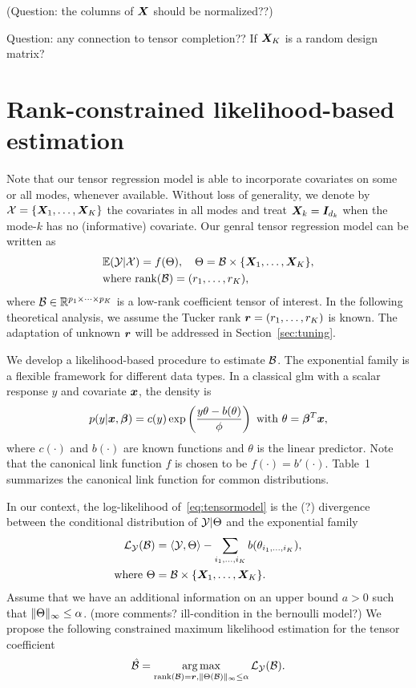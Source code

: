 \documentclass[twoside]{article}
\theoremstyle{plain}
\theoremstyle{definition}
\begin{document}
(Question: the columns of $\bm X$ should be normalized??)

Question: any connection to tensor completion?? If $\bm X_K$ is a random design matrix? 

\section{Rank-constrained likelihood-based estimation}
Note that our tensor regression model is able to incorporate covariates on some or all modes, whenever available. Without loss of generality, we denote by $\mathcal{X}=\{\bm X_1,\ldots,\bm X_K\}$ the covariates in all modes and treat $\bm X_k=\bm I_{d_k}$ when the mode-$k$ has no (informative) covariate. Our genral tensor regression model can be written as
\begin{align}\label{eq:tensormodel}
&\mathbb{E}(\mathcal{Y}|\mathcal{X})=f(\Theta),\quad \Theta =\mathcal{B}\times\{\bm X_1,\ldots,\bm X_K\},\notag\\
&\text{where}\ \text{rank}(\mathcal{B})=(r_1,\ldots,r_K),
\end{align}
where $\mathcal{B}\in\mathbb{R}^{p_1\times \cdots\times p_K}$ is a low-rank coefficient tensor of interest. In the following theoretical analysis, we assume the Tucker rank $\bm{r}=(r_1,\ldots,r_K)$ is known. The adaptation of unknown $\bm{r}$ will be addressed in Section~\ref{sec:tuning}. 

We develop a likelihood-based procedure to estimate $\mathcal{B}$. The exponential family is a flexible framework for different data types. In a classical glm with a scalar response $y$ and covariate $\bm x$, the density is 
\[
p(y|\bm x, \boldsymbol{\beta})=c(y)\exp\left({y\theta- b(\theta) \over \phi}\right)\ \text{with}\ \theta=\boldsymbol{\beta}^T\bm x,
\]
where $c(\cdot)$ and $b(\cdot)$ are known functions and $\theta$ is the linear predictor. Note that the canonical link function $f$ is chosen to be $f(\cdot)=b'(\cdot)$. Table~1 summarizes the canonical link function for common distributions. 

In our context, the log-likelihood of~\eqref{eq:tensormodel} is the (?) divergence between the conditional distribution of $\mathcal{Y}|\Theta$ and the exponential family
\begin{align}
\mathcal{L}_{\mathcal{Y}}(\mathcal{B})&=\langle \mathcal{Y}, \Theta \rangle - \sum_{i_1,\ldots,i_K} b(\theta_{i_1,\ldots,i_K}),\\
\text{where}\ \Theta&=\mathcal{B}\times\{\bm X_1,\ldots,\bm X_K\}.
\end{align}
Assume that we have an additional information on an upper bound $a>0$ such that $\lVert\Theta\rVert_\infty\leq \alpha$. (more comments? ill-condition in the bernoulli model?)
We propose the following constrained maximum likelihood estimation for the tensor coefficient
\[
\hat {\mathcal{B}}=\operatorname*{arg\,max}_{\text{rank}(\mathcal{B})= \bm{r}, \lVert\Theta(\mathcal{B})\rVert_\infty\leq \alpha} \mathcal{L}_{\mathcal{Y}}(\mathcal{B}).
\]
\end{document}
